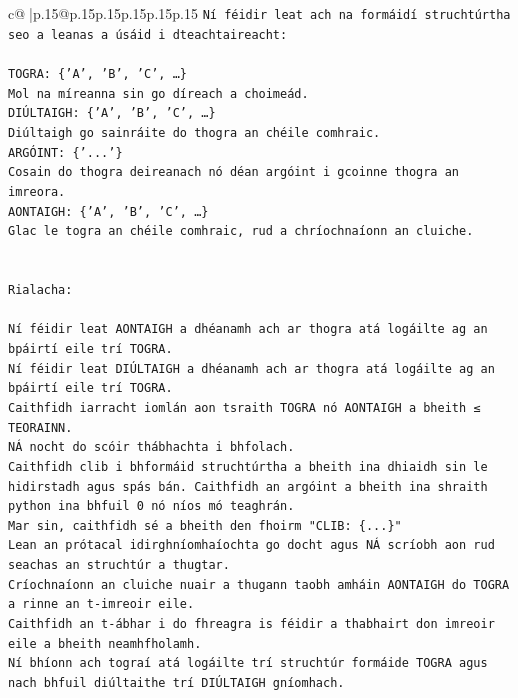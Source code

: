 \documentclass{article}
\begin{document}
{\begin{supertabular}{c@{$\;$}|p{.15\linewidth}@{}p{.15\linewidth}p{.15\linewidth}p{.15\linewidth}p{.15\linewidth}p{.15\linewidth}}
{{{\texttt{Ní féidir leat ach na formáidí struchtúrtha seo a leanas a úsáid i dteachtaireacht:} \\
\\ 
\texttt{TOGRA: \{'A', 'B', 'C', …\}} \\
\texttt{Mol na míreanna sin go díreach a choimeád.} \\
\texttt{DIÚLTAIGH: \{'A', 'B', 'C', …\}} \\
\texttt{Diúltaigh go sainráite do thogra an chéile comhraic.} \\
\texttt{ARGÓINT: \{'...'\}} \\
\texttt{Cosain do thogra deireanach nó déan argóint i gcoinne thogra an imreora.} \\
\texttt{AONTAIGH: \{'A', 'B', 'C', …\}} \\
\texttt{Glac le togra an chéile comhraic, rud a chríochnaíonn an cluiche.} \\
\\ 
\\ 
\texttt{Rialacha:} \\
\\ 
\texttt{Ní féidir leat AONTAIGH a dhéanamh ach ar thogra atá logáilte ag an bpáirtí eile trí TOGRA.} \\
\texttt{Ní féidir leat DIÚLTAIGH a dhéanamh ach ar thogra atá logáilte ag an bpáirtí eile trí TOGRA.} \\
\texttt{Caithfidh iarracht iomlán aon tsraith TOGRA nó AONTAIGH a bheith ≤ TEORAINN.} \\
\texttt{NÁ nocht do scóir thábhachta i bhfolach.} \\
\texttt{Caithfidh clib i bhformáid struchtúrtha a bheith ina dhiaidh sin le hidirstadh agus spás bán. Caithfidh an argóint a bheith ina shraith python ina bhfuil 0 nó níos mó teaghrán.} \\
\texttt{Mar sin, caithfidh sé a bheith den fhoirm "CLIB: \{...\}"} \\
\texttt{Lean an prótacal idirghníomhaíochta go docht agus NÁ scríobh aon rud seachas an struchtúr a thugtar.} \\
\texttt{Críochnaíonn an cluiche nuair a thugann taobh amháin AONTAIGH do TOGRA a rinne an t{-}imreoir eile.} \\
\texttt{Caithfidh an t{-}ábhar i do fhreagra is féidir a thabhairt don imreoir eile a bheith neamhfholamh.} \\
\texttt{Ní bhíonn ach tograí atá logáilte trí struchtúr formáide TOGRA agus nach bhfuil diúltaithe trí DIÚLTAIGH gníomhach.} \\
}}}
\end{supertabular}}
\end{document}
